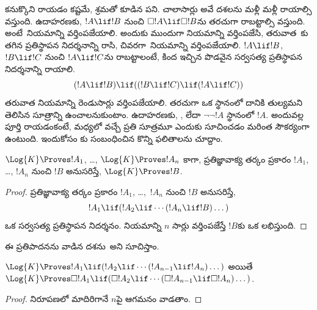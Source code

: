 \documentclass[../../../include/open-logic-section]{subfiles}
\begin{document}


 కనుక్కొని రాయడం కష్టమే, శ్రమతో కూడిన పని.
చాలాసార్లు అవే దశలను మళ్లీ మళ్లీ రాయాల్సి వస్తుంది. ఉదాహరణకు, $!A \lif !B$ నుంచి
$\Box !A \lif \Box !B$ను తరచుగా రాబట్టాల్సి వస్తుంది.
అంటే~\RK నియమాన్ని వర్తింపజేయాలి. అందుకు ముందుగా
\Nec నియమాన్ని వర్తింపజేసి, తరువాత~కు తగిన ప్రతిస్థాపన
నిదర్శనాన్ని రాసి, చివరగా~\MP నియమాన్ని వర్తింపజేయాలి. $!A \lif !B$, $!B \lif !C$
నుంచి $!A \lif !C$ను రాబట్టాలంటే, కింద ఇచ్చిన పొడవైన
సర్వసత్య ప్రతిస్థాపన నిదర్శనాన్ని రాయాలి.
\[
(!A \lif !B) \lif ((!B \lif !C) \lif (!A \lif !C))
\]
తరువాత \MP నియమాన్ని రెండుసార్లు వర్తింపజేయాలి. తరచుగా ఒక
 స్థానంలో దానికి తుల్యమని తెలిసిన
సూత్రాన్ని ఉంచాలనుకుంటాం. ఉదాహరణకు,
, లేదా $\lnot\lnot !A$ స్థానంలో $!A$.
అందువల్ల పూర్తి  రాయడంకంటే,
మధ్యలో వచ్చే ప్రతి సూత్రమూ ఎందుకు 
సూచించడం మరింత సౌకర్యంగా ఉంటుంది. ఇందుకోసం
కు సంబంధించిన కొన్ని
ఫలితాలను చూద్దాం.

\begin{prop}
  $\Log{K} \Proves !A_1$, \dots, $\Log{K} \Proves !A_n$ కాగా,
  ప్రతిజ్ఞావాక్య తర్కం ప్రకారం $!A_1$, \dots, $!A_n$ నుంచి $!B$
  అనుసరిస్తే, $\Log{K} \Proves !B$.
\end{prop}

\begin{proof}
  ప్రతిజ్ఞావాక్య తర్కం ప్రకారం $!A_1$, \dots,~$!A_n$ నుంచి $!B$
  అనుసరిస్తే,
  \[
  !A_1 \lif (!A_2 \lif \cdots (!A_n \lif !B)\dots)
  \]
  ఒక సర్వసత్య ప్రతిస్థాపన నిదర్శనం. \MP{} నియమాన్ని $n$ సార్లు వర్తింపజేస్తే
  $!B$కు ఒక  లభిస్తుంది.
\end{proof}

ఈ ప్రతిపాదనను వాడిన దశను~\PL అని సూచిస్తాం.

\begin{prop}
  $\Log{K} \Proves !A_1 \lif (!A_2 \lif \cdots (!A_{n-1} \lif
  !A_n)\dots)$ అయితే $\Log{K} \Proves \Box !A_1 \lif (\Box !A_2 \lif
  \cdots (\Box !A_{n-1} \lif \Box !A_n)\dots)$.
\end{prop}

\begin{proof}
   నిరూపణలో మాదిరిగానే $n$పై ఆగమనం వాడతాం.
\end{proof}
\end{document}
